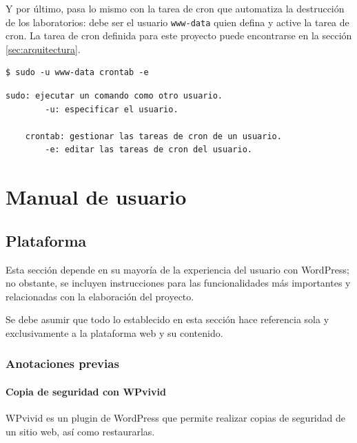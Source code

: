         Y por último, pasa lo mismo con la tarea de cron que automatiza la destrucción de los laboratorios: debe ser el usuario \texttt{www-data} quien defina y active la tarea de cron. La tarea de cron definida para este proyecto puede encontrarse en la sección \ref{sec:arquitectura}.
        \\

        \begin{lstlisting}[style=bash_style]
    $ sudo -u www-data crontab -e
        \end{lstlisting}

        \begin{lstlisting}[style=comment_style]
    sudo: ejecutar un comando como otro usuario.
        -u: especificar el usuario.

    crontab: gestionar las tareas de cron de un usuario.
        -e: editar las tareas de cron del usuario.
        \end{lstlisting}

        \cleardoublepage



\chapter{Manual de usuario}

    \section{Plataforma}

        Esta sección depende en su mayoría de la experiencia del usuario con WordPress; no obstante, se incluyen instrucciones para las funcionalidades más importantes y relacionadas con la elaboración del proyecto.

        Se debe asumir que todo lo establecido en esta sección hace referencia sola y exclusivamente a la plataforma web y su contenido.

        \subsection{Anotaciones previas}

            \subsubsection{Copia de seguridad con WPvivid}

                WPvivid \cite{wpvivid} es un plugin de WordPress que permite realizar copias de seguridad de un sitio web, así como restaurarlas.
                

